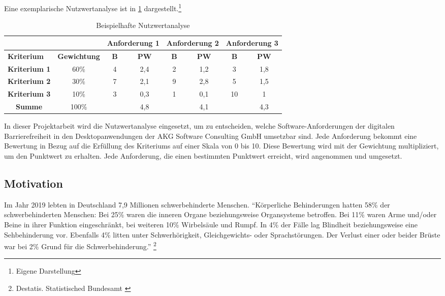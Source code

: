 Eine exemplarische Nutzwertanalyse ist in \cref{table:Beispielhafte Nutzwertanalyse} dargestellt.\footnote{Eigene Darstellung}

\begin{table}[H]
\caption[Beispielhafte Nutzwertanalyse]{Beispielhafte Nutzwertanalyse}
\vspace{0,1cm}
\begin{tabular}{cc|c|c|c|c|c|c|}
	\cline{3-8}
	& & \multicolumn{2}{c|}{\textbf{Anforderung 1}} & \multicolumn{2}{c|}{\textbf{Anforderung 2}} & \multicolumn{2}{c|}{\textbf{Anforderung 3}} \\ \hline
	\multicolumn{1}{|l|}{\textbf{Kriterium}} & \textbf{Gewichtung} & \textbf{B} & \textbf{PW} & \textbf{B} & \textbf{PW} & \textbf{B} & \textbf{PW} \\ \hline
	\multicolumn{1}{|l|}{\textbf{Kriterium 1}} & 60\%  & 4 & 2,4 & 2 & 1,2 & 3  & 1,8 \\ \hline
	\multicolumn{1}{|l|}{\textbf{Kriterium 2}} & 30\%  & 7 & 2,1 & 9 & 2,8 & 5  & 1,5 \\ \hline
	\multicolumn{1}{|l|}{\textbf{Kriterium 3}} & 10\%  & 3 & 0,3 & 1 & 0,1 & 10 & 1   \\ \hline
	\multicolumn{1}{|c|}{\textbf{Summe}}       & 100\% &   & 4,8 &   & 4,1 &    & 4,3 \\ \cline{1-2} \cline{4-4} \cline{6-6} \cline{8-8} 
\end{tabular}
\label{table:Beispielhafte Nutzwertanalyse}
\end{table}

In dieser Projektarbeit wird die Nutzwertanalyse eingesetzt, um zu entscheiden, welche Software-Anforderungen der digitalen Barrierefreiheit in den Desktopanwendungen der AKG Software Consulting GmbH umsetzbar sind. Jede Anforderung bekommt eine Bewertung in Bezug auf die Erfüllung des Kriteriums auf einer Skala von 0 bis 10. Diese Bewertung wird mit der Gewichtung multipliziert, um den Punktwert zu erhalten. Jede Anforderung, die einen bestimmten Punktwert erreicht, wird angenommen und umgesetzt. 
\\


\subsection{Motivation}
Im Jahr 2019 lebten in Deutschland 7,9 Millionen schwerbehinderte Menschen. "`Körperliche Behinderungen hatten 58\% der schwerbehinderten Menschen: Bei 25\% waren die inneren Organe beziehungsweise Organsysteme betroffen. Bei 11\% waren Arme und/oder Beine in ihrer Funktion eingeschränkt, bei weiteren 10\% Wirbelsäule und Rumpf. In 4\% der Fälle lag Blindheit beziehungsweise eine Sehbehinderung vor. Ebenfalls 4\% litten unter Schwerhörigkeit, Gleichgewichts- oder Sprachstörungen. Der Verlust einer oder beider Brüste war bei 2\% Grund für die Schwerbehinderung."' \footnote{Destatis. Statistisched Bundesamt \cite{DESTATIS}}

